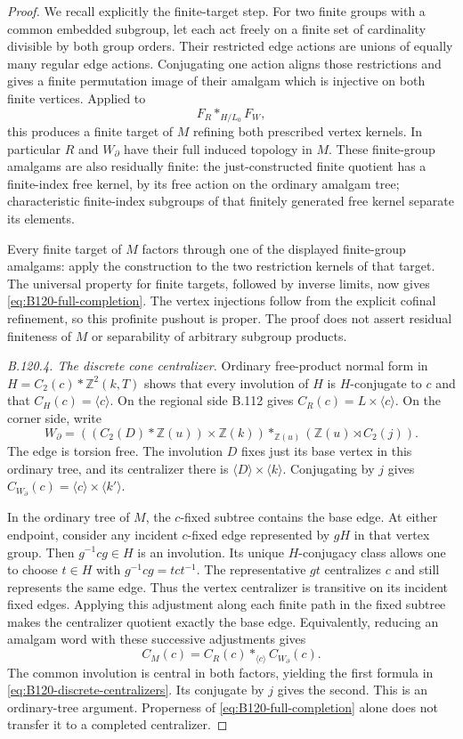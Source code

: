 \begin{proof}
We recall explicitly the finite-target step. For two finite groups
with a common embedded subgroup, let each act freely on a finite
set of cardinality divisible by both group orders. Their restricted
edge actions are unions of equally many regular edge actions.
Conjugating one action aligns those restrictions and gives a
finite permutation image of their amalgam which is injective on
both finite vertices. Applied to
\[
 F_R*_{H/L_0}F_W,
\]
this produces a finite target of $M$ refining both prescribed
vertex kernels. In particular $R$ and $W_{\partial}$ have their
full induced topology in $M$. These finite-group amalgams are
also residually finite: the just-constructed finite quotient has
a finite-index free kernel, by its free action on the ordinary
amalgam tree; characteristic finite-index subgroups of that
finitely generated free kernel separate its elements.

Every finite target of $M$ factors through one of the displayed
finite-group amalgams: apply the construction to the two
restriction kernels of that target. The universal property for
finite targets, followed by inverse limits, now gives
\eqref{eq:B120-full-completion}. The vertex injections follow
from the explicit cofinal refinement, so this profinite pushout
is proper. The proof does not assert residual finiteness of $M$
or separability of arbitrary subgroup products.

\emph{B.120.4. The discrete cone centralizer.}
Ordinary free-product normal form in
$H=C_2(c)*\mathbb Z^2(k,T)$ shows that every involution of $H$
is $H$-conjugate to $c$ and that $C_H(c)=\langle c\rangle$.
On the regional side B.112 gives
$C_R(c)=L\times\langle c\rangle$. On the corner side, write
\[
 W_{\partial}=
   ((C_2(D)*\mathbb Z(u))\times\mathbb Z(k))
       *_{\mathbb Z(u)}(\mathbb Z(u)\rtimes C_2(j)).
\]
The edge is torsion free. The involution $D$ fixes just its base
vertex in this ordinary tree, and its centralizer there is
$\langle D\rangle\times\langle k\rangle$. Conjugating by $j$
gives $C_{W_{\partial}}(c)=\langle c\rangle\times\langle k'\rangle$.

In the ordinary tree of $M$, the $c$-fixed subtree contains the
base edge. At either endpoint, consider any incident $c$-fixed
edge represented by $gH$ in that vertex group. Then
$g^{-1}cg\in H$ is an involution. Its unique $H$-conjugacy class
allows one to choose $t\in H$ with
$g^{-1}cg=tct^{-1}$. The representative $gt$ centralizes $c$
and still represents the same edge. Thus the vertex centralizer
is transitive on its incident fixed edges. Applying this adjustment
along each finite path in the fixed subtree makes the centralizer
quotient exactly the base edge. Equivalently, reducing an amalgam
word with these successive adjustments gives
\[
 C_M(c)=C_R(c)*_{\langle c\rangle}C_{W_{\partial}}(c).
\]
The common involution is central in both factors, yielding the
first formula in \eqref{eq:B120-discrete-centralizers}.
Its conjugate by $j$ gives the second. This is an ordinary-tree
argument. Properness of \eqref{eq:B120-full-completion} alone
does not transfer it to a completed centralizer.


\end{proof}
